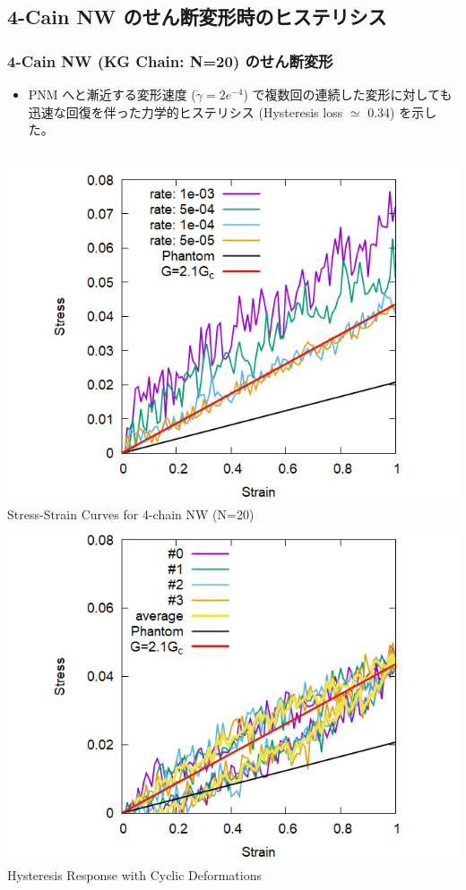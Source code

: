 \documentclass[12pt, dvipdfmx]{beamer}
\begin{document}
\subsection{4-Cain NW のせん断変形時のヒステリシス}
\begin{frame}
	\frametitle{4-Cain NW (KG Chain: N=20) のせん断変形}
	\begin{itemize}
		\item PNM へと漸近する変形速度 ($\dot{\gamma} = 2e^{-4}$) で複数回の連続した変形に対しても迅速な回復を伴った力学的ヒステリシス (Hysteresis loss $\simeq$ 0.34) を示した。
	\end{itemize}

	\begin{columns}[totalwidth=\linewidth]
			\centering
				\includegraphics[width=\textwidth]{Shear_Random_4chain_N20.png}
				Stress-Strain Curves for 4-chain NW (N=20)
			\centering
				\includegraphics[width=\textwidth]{CyclicDeform_4chain_rate_2e-4.png}
				Hysteresis Response with Cyclic Deformations
		\end{columns}
\end{frame}
\end{document}
